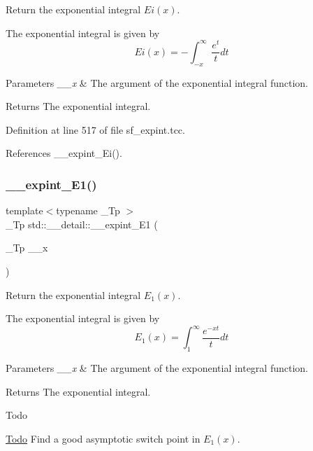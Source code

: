Return the exponential integral $ Ei(x) $. 

The exponential integral is given by \[ Ei(x) = -\int_{-x}^\infty \frac{e^t}{t} dt \]


\begin{DoxyParams}{Parameters}
{\em \+\_\+\+\_\+x} & The argument of the exponential integral function. \\
\hline
\end{DoxyParams}
\begin{DoxyReturn}{Returns}
The exponential integral. 
\end{DoxyReturn}


Definition at line 517 of file sf\+\_\+expint.\+tcc.



References \+\_\+\+\_\+expint\+\_\+\+Ei().

\mbox{\label{namespacestd_1_1____detail_a665eb0c524b929c035d88bbb17815917}} 
\subsubsection{\texorpdfstring{\+\_\+\+\_\+expint\+\_\+\+E1()}{\_\_expint\_E1()}}
{\footnotesize\ttfamily template$<$typename \+\_\+\+Tp $>$ \\
\+\_\+\+Tp std\+::\+\_\+\+\_\+detail\+::\+\_\+\+\_\+expint\+\_\+\+E1 (\begin{DoxyParamCaption}\item[{\+\_\+\+Tp}]{\+\_\+\+\_\+x }\end{DoxyParamCaption})}



Return the exponential integral $ E_1(x) $. 

The exponential integral is given by \[ E_1(x) = \int_{1}^\infty \frac{e^{-xt}}{t} dt \]


\begin{DoxyParams}{Parameters}
{\em \+\_\+\+\_\+x} & The argument of the exponential integral function. \\
\hline
\end{DoxyParams}
\begin{DoxyReturn}{Returns}
The exponential integral. 
\end{DoxyReturn}
\begin{DoxyRefDesc}{Todo}
\item[\hyperlink{todo__todo000006}{Todo}]Find a good asymptotic switch point in $ E_1(x) $. \end{DoxyRefDesc}


